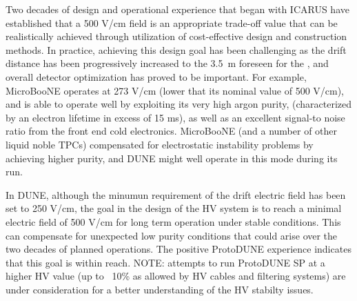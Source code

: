 Two decades of design and operational experience that began with ICARUS have established that a 500 V/cm field is an appropriate trade-off value that can be realistically achieved through utilization of cost-effective design and construction methods. In practice, achieving this design goal has been challenging as the drift distance has been progressively increased to the 
\SI{3.5}{m} foreseen for the , and overall detector optimization has proved to be important. For example, MicroBooNE operates  at 273 V/cm (lower that its nominal value of 500 V/cm), and is able to operate well by exploiting its very high argon purity, (characterized by an electron lifetime in excess of 15 ms), as well as an excellent signal-to noise ratio from the front end cold electronics.  %
MicroBooNE (and a number of other liquid noble TPCs) compensated for electrostatic instability problems by achieving higher purity, and DUNE might well operate in this mode during its run. 

In DUNE, although the minumun requirement of the drift electric field has been set to 250 V/cm, the goal in the design of the HV system is to reach a minimal electric field of 500 V/cm for long term operation under stable conditions. This can compensate for unexpected low purity conditions that could arise over the two decades of planned operations. The positive ProtoDUNE experience indicates that this goal is within reach. NOTE: attempts to run ProtoDUNE SP at a higher HV value (up to ~10\% as allowed by HV cables and filtering systems) are under consideration for a better understanding of the HV stabilty issues.

